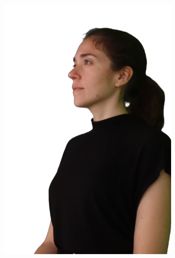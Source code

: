 \begin{figure}[!ht]
\begin{subfigure}{0.12\linewidth}
        \includegraphics[width=\textwidth]{Figures/results/initials/irene/26_render.png}

\end{subfigure}
\end{figure}
